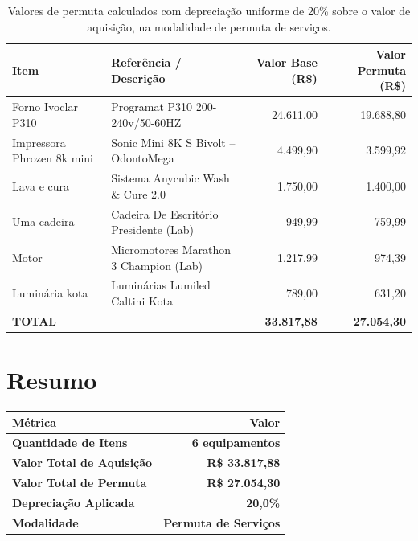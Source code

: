 \documentclass[12pt, a4paper]{article}
\newcommand{\reais}[1]{R\$ #1}
\begin{document}
\begin{table}[H]
    \centering
    \renewcommand{\arraystretch}{1.4}
    \begin{tabularx}{\textwidth}{>{\raggedright\arraybackslash}X >{\raggedright\arraybackslash}p{5.5cm} r r}
        \toprule
        \rowcolor{tableHeader} \textbf{Item} & \textbf{Referência / Descrição} & \textbf{Valor Base (R\$)} & \textbf{Valor Permuta (R\$)} \\
        \midrule
        Forno Ivoclar P310 & Programat P310 200-240v/50-60HZ & 24.611,00 & 19.688,80 \\
        Impressora Phrozen 8k mini & Sonic Mini 8K S Bivolt -- OdontoMega & 4.499,90 & 3.599,92 \\
        Lava e cura & Sistema Anycubic Wash \& Cure 2.0 & 1.750,00 & 1.400,00 \\
        Uma cadeira & Cadeira De Escritório Presidente (Lab) & 949,99 & 759,99 \\
        Motor & Micromotores Marathon 3 Champion (Lab) & 1.217,99 & 974,39 \\
        Luminária kota & Luminárias Lumiled Caltini Kota & 789,00 & 631,20 \\
        \midrule
        \rowcolor{lightGray} \textbf{TOTAL} & & \textbf{33.817,88} & \textbf{27.054,30} \\
        \bottomrule
    \end{tabularx}
    \caption*{\footnotesize Valores de permuta calculados com depreciação uniforme de 20\% sobre o valor de aquisição, na modalidade de permuta de serviços.}
\end{table}

\section{Resumo}

\begin{table}[H]
    \centering
    \large
    \renewcommand{\arraystretch}{1.5}
    \begin{tabularx}{0.85\textwidth}{X r}
        \toprule
        \rowcolor{tableHeader} \textbf{Métrica} & \textbf{Valor} \\
        \midrule
        \textbf{Quantidade de Itens} & \textbf{6 equipamentos} \\
        \textbf{Valor Total de Aquisição} & \textbf{\reais{33.817,88}} \\
        \textbf{Valor Total de Permuta} & \textbf{\reais{27.054,30}} \\
        \textbf{Depreciação Aplicada} & \textbf{20,0\%} \\
        \textbf{Modalidade} & \textbf{Permuta de Serviços} \\
        \bottomrule
    \end{tabularx}
\end{table}
\end{document}
